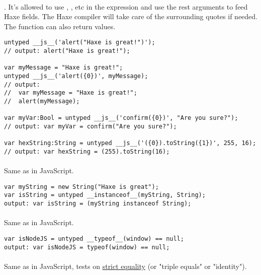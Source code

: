 \paragraph{}
. It's allowed to use , ,  etc in the expression and use the rest arguments to feed Haxe fields. The Haxe compiler will take care of the surrounding quotes if needed. The function can also return values.

\begin{lstlisting}
untyped __js__('alert("Haxe is great!")');
// output: alert("Haxe is great!");

var myMessage = "Haxe is great!";
untyped __js__('alert({0})', myMessage);
// output:
//	var myMessage = "Haxe is great!";
//	alert(myMessage);

var myVar:Bool = untyped __js__('confirm({0})', "Are you sure?");
// output: var myVar = confirm("Are you sure?");

var hexString:String = untyped __js__('({0}).toString({1})', 255, 16);
// output: var hexString = (255).toString(16);
\end{lstlisting}

\paragraph{}
Same as  in JavaScript.

\begin{lstlisting}
var myString = new String("Haxe is great");
var isString = untyped __instanceof__(myString, String);
output: var isString = (myString instanceof String);
\end{lstlisting}

\paragraph{}
Same as  in JavaScript.

\begin{lstlisting}
var isNodeJS = untyped __typeof__(window) == null;
output: var isNodeJS = typeof(window) == null;
\end{lstlisting}

\paragraph{}
Same as   in JavaScript, tests on \href{https://developer.mozilla.org/en-US/docs/Web/JavaScript/Equality_comparisons_and_sameness}{strict equality} (or "triple equals" or "identity").

